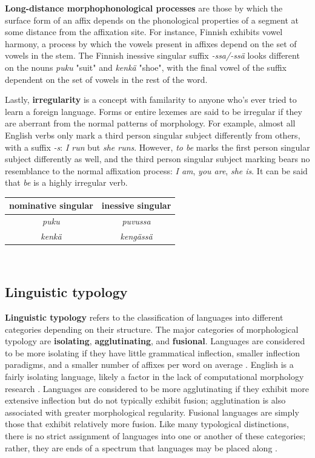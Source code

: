 \textbf{Long-distance morphophonological processes} are those by which the surface form of an affix depends on the phonological properties of a segment at some distance from the affixation site. For instance, Finnish exhibits vowel harmony, a process by which the vowels present in affixes depend on the set of vowels in the stem. The Finnish inessive singular suffix \textit{-ssa/-ssä} looks different on the nouns \textit{puku} "suit" and \textit{kenkä} "shoe", with the final vowel of the suffix dependent on the set of vowels in the rest of the word. 

Lastly, \textbf{irregularity} is a concept with familarity to anyone who's ever tried to learn a foreign language. Forms or entire lexemes are said to be irregular if they are aberrant from the normal patterns of morphology. For example, almost all English verbs only mark a third person singular subject differently from others, with a suffix \textit{-s}: \textit{I run} but \textit{she runs}. However, \textit{to be} marks the first person singular subject differently as well, and the third person singular subject marking bears no resemblance to the normal affixation process: \textit{I am}, \textit{you are}, \textit{she is}. It can be said that \textit{be} is a highly irregular verb.

\begin{center}
\begin{tabular}{|c|c|}
\hline
nominative singular & inessive singular \\
\hline \hline
\textit{puku} & \textit{puvussa} \\
\hline 
\textit{kenkä} & \textit{kengässä} \\
\hline
\end{tabular} \\
\vspace{.3cm}
\parencite{Wiktionary}
\end{center}

\subsection{Linguistic typology}

\textbf{Linguistic typology} refers to the classification of languages into different categories depending on their structure. The major categories of morphological typology are \textbf{isolating}, \textbf{agglutinating}, and \textbf{fusional}. Languages are considered to be more isolating if they have little grammatical inflection, smaller inflection paradigms, and a smaller number of affixes per word on average \parencite{Hogan2010}. English is a fairly isolating language, likely a factor in the lack of computational morphology research \parencite{Cotterell2017}. Languages are considered to be more agglutinating if they exhibit more extensive inflection but do not typically exhibit fusion; agglutination is also associated with greater morphological regularity. Fusional languages are simply those that exhibit relatively more fusion. Like many typological distinctions, there is no strict assignment of languages into one or another of these categories; rather, they are ends of a spectrum that languages may be placed along \parencite{Hogan2010}.

